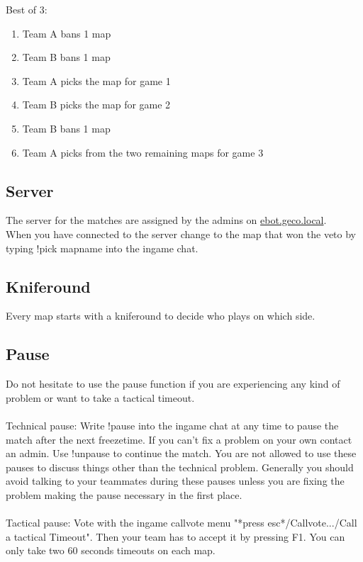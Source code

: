 \documentclass{article}
\begin{document}
Best of 3:
\begin{enumerate}
\item Team A bans 1 map
\item Team B bans 1 map
\item Team A picks the map for game 1
\item Team B picks the map for game 2
\item Team B bans 1 map
\item Team A picks from the two remaining maps for game 3
\end{enumerate}

\subsection{Server}
The server for the matches are assigned by the admins on \href{http://ebot.geco.local}{ebot.geco.local}.\\
When you have connected to the server change to the map that won the veto by typing {\selectfont 
!pick mapname} into the ingame chat.

\subsection{Kniferound}
Every map starts with a kniferound to decide who plays on which side.


\subsection{Pause}
\label{sec:pause}
Do not hesitate to use the pause function if you are experiencing any kind of problem or want to take a tactical timeout.\\
\\Technical pause: Write {\selectfont 
!pause}  into the ingame chat at any time to pause the match after the next freezetime. If you can't fix a problem on your own contact an admin. Use {\selectfont 
!unpause} to continue the match. You are not allowed to use these pauses to discuss things other than the technical problem. Generally you should avoid talking to your teammates during these pauses unless you are fixing the problem making the pause necessary in the first place.\\
\\Tactical pause: Vote with the ingame callvote menu "*press esc*/Callvote.../Call a tactical Timeout". Then your team has to accept it by pressing F1. You can only take two 60 seconds timeouts on each map.
\end{document}
